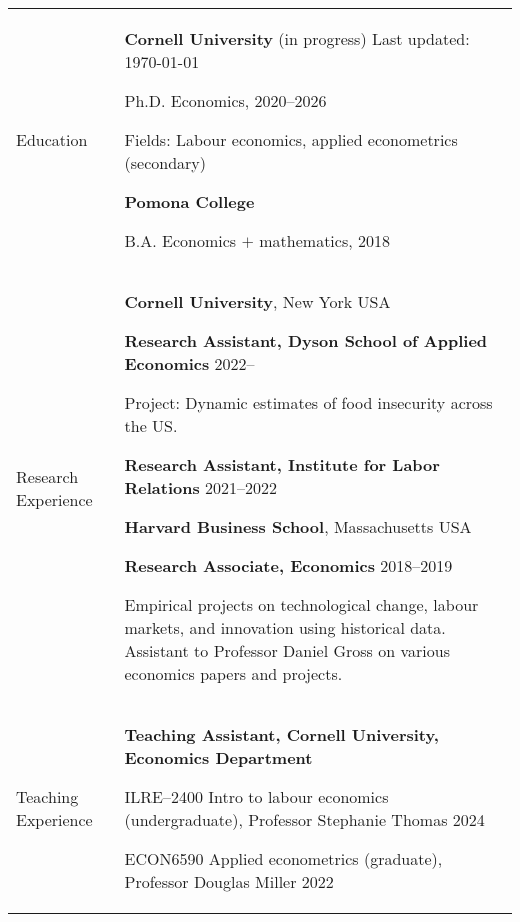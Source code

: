 \documentclass[letterpaper,11pt,oneside]{article}
\begin{document}
\noindent
\begin{tabular}[\textwidth]{p{} p{}}
    \Large{Education}
    & \textbf{Cornell University} (in progress)  \hfill Last updated: \today

    Ph.D. Economics, 2020--2026
    
    Fields: Labour economics, applied econometrics (secondary)
    
    \textbf{Pomona College}

    B.A. Economics $+$ mathematics, 2018 \vspace{0.2cm} \\
    
    
    
\Large{Research Experience}
    & \textbf{Cornell University}, New York USA
    
    \textbf{Research Assistant, Dyson School of Applied Economics} \hfill 2022--

    Project: Dynamic estimates of food insecurity across the US.
    
    \textbf{Research Assistant, Institute for Labor Relations} \hfill 2021--2022
    \vspace{0.1cm}

    \textbf{Harvard Business School}, Massachusetts USA
    
    \textbf{Research Associate, Economics} \hfill 2018--2019
    
    Empirical projects on technological change, labour markets, and innovation using historical data.
    Assistant to Professor Daniel Gross on various economics papers and projects.
    \vspace{0.2cm} \\

\Large{Teaching Experience}
    & \textbf{Teaching Assistant, Cornell University, Economics Department}
    
    ILRE--2400 Intro to labour economics (undergraduate), Professor Stephanie Thomas \hfill 2024

    ECON6590 Applied econometrics (graduate), Professor Douglas Miller \hfill 2022


\end{tabular}
\end{document}
